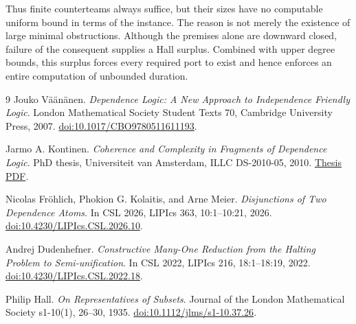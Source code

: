 \documentclass[11pt,a4paper]{article}
\theoremstyle{definition}
\begin{document}
Thus finite counterteams always suffice, but their sizes have no
computable uniform bound in terms of the instance. The reason is
not merely the existence of large minimal obstructions. Although
the premises alone are downward closed, failure of the consequent
supplies a Hall surplus. Combined with upper degree bounds, this
surplus forces every required port to exist and hence enforces an
entire computation of unbounded duration.

\begingroup
\small
\begin{thebibliography}{9}
\setlength{\itemsep}{3pt}
Jouko V\"a\"an\"anen.
\emph{Dependence Logic: A New Approach to Independence Friendly Logic}.
London Mathematical Society Student Texts 70,
Cambridge University Press, 2007.
\href{https://doi.org/10.1017/CBO9780511611193}{doi:10.1017/CBO9780511611193}.

Jarmo A. Kontinen.
\emph{Coherence and Complexity in Fragments of Dependence Logic}.
PhD thesis, Universiteit van Amsterdam, ILLC DS-2010-05, 2010.
\href{https://pure.uva.nl/ws/files/817636/77418_thesis.pdf}{Thesis PDF}.

Nicolas Fr\"ohlich, Phokion G. Kolaitis, and Arne Meier.
\emph{Disjunctions of Two Dependence Atoms}.
In CSL 2026, LIPIcs 363, 10:1--10:21, 2026.
\href{https://doi.org/10.4230/LIPIcs.CSL.2026.10}{doi:10.4230/LIPIcs.CSL.2026.10}.

{\raggedright
Andrej Dudenhefner.
\emph{Constructive Many-One Reduction from the Halting Problem to
Semi-unification}. In CSL 2022, LIPIcs 216, 18:1--18:19, 2022.
\href{https://doi.org/10.4230/LIPIcs.CSL.2022.18}{doi:10.4230/LIPIcs.CSL.2022.18}.\par}

Philip Hall. \emph{On Representatives of Subsets}.
Journal of the London Mathematical Society s1-10(1), 26--30, 1935.
\href{https://doi.org/10.1112/jlms/s1-10.37.26}{doi:10.1112/jlms/s1-10.37.26}.
\end{thebibliography}
\endgroup
\end{document}

